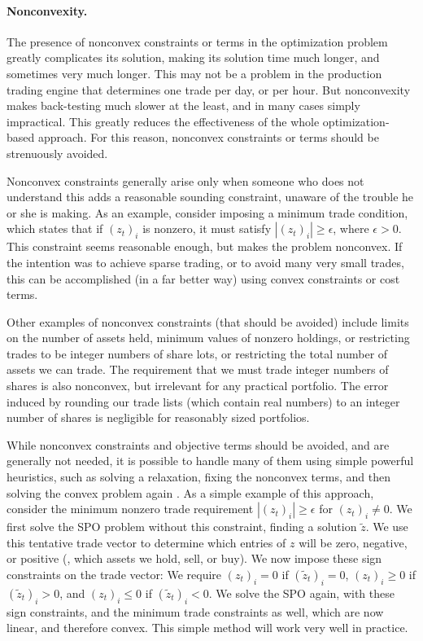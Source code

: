 \documentclass[openany]{article}  %
\begin{document}
\paragraph{Nonconvexity.}
The presence of nonconvex constraints or terms in the optimization problem
greatly complicates its solution, making its solution time much longer,
and sometimes very much longer.  This may not be a problem in the production
trading engine that determines one trade per day, or per hour.
But nonconvexity makes back-testing much slower
at the least, and in many cases simply impractical.
This greatly reduces the effectiveness of the whole optimization-based approach.
For this reason, nonconvex constraints or terms should be strenuously avoided.

Nonconvex constraints generally arise only when someone who does not understand
this adds a reasonable sounding constraint, unaware of the trouble he or she is
making.  As an example, consider imposing a minimum trade condition, which states
that if $(z_t)_i$ is nonzero, it must satisfy $|(z_t)_i| \geq \epsilon$, where
$\epsilon >0$.  This constraint seems reasonable enough,
but makes the problem nonconvex.
If the intention was to achieve sparse trading, or to avoid
many very small trades, this can be accomplished
(in a far better way) using convex constraints or cost terms.

Other examples of nonconvex constraints (that should be avoided) include
limits on the number of assets held,
minimum values of nonzero holdings, or restricting trades to be integer
numbers of share lots, or restricting the total number of assets we can trade.
The requirement that we must trade integer numbers of shares is also
nonconvex, but irrelevant for any practical portfolio.
The error induced by rounding our trade lists (which contain real numbers) to
an integer number of shares is negligible for reasonably sized portfolios.

While nonconvex constraints and objective terms should be avoided, and
are generally not needed,
it is possible to handle many of them using simple powerful heuristics,
such as solving a relaxation, fixing the nonconvex terms, and then solving
the convex problem again \cite{diamondtakapoui2016}.
As a simple example of this approach,
consider the minimum nonzero trade requirement
$|(z_t)_i| \geq \epsilon$ for $(z_t)_i \neq 0$.
We first solve the SPO problem without this constraint, finding a solution
$\tilde z$. We use this tentative trade vector to determine
which entries of $z$ will be zero, negative, or positive (\ie, which assets
we hold, sell, or buy).  We now impose these
sign constraints on the trade vector:
We require $(z_t)_i=0$ if $(\tilde z_t)_i=0$,
$(z_t)_i\geq 0$ if $(\tilde z_t)_i>0$,
and $(z_t)_i\leq 0$ if $(\tilde z_t)_i<0$.
We solve the SPO again, with these sign
constraints, and the minimum trade constraints as well, which are now
linear, and therefore convex.  This simple method will work very well in
practice.
\end{document}
